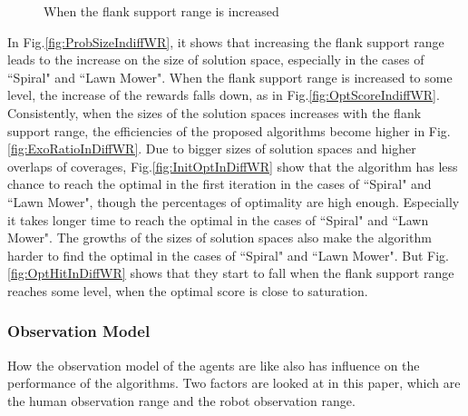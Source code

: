 \documentclass[12pt]{article}
\begin{document}
\begin{figure}[H]
  \caption{When the flank support range is increased} 
  \label{fig:PMdiffWR2} %
\end{figure}

In Fig.\ref{fig:ProbSizeIndiffWR}, it shows that increasing the flank support range leads to the increase on the size of solution space, especially in the cases of ``Spiral" and ``Lawn Mower". When the flank support range is increased to some level, the increase of the rewards falls down, as in Fig.\ref{fig:OptScoreIndiffWR}. Consistently, when the sizes of the solution spaces increases with the flank support range, the efficiencies of the proposed algorithms become higher in Fig.\ref{fig:ExoRatioInDiffWR}. Due to bigger sizes of solution spaces and higher overlaps of coverages, Fig.\ref{fig:InitOptInDiffWR} show that the algorithm has less chance to reach the optimal in the first iteration in the cases of ``Spiral" and ``Lawn Mower", though the percentages of optimality are high enough. Especially it takes longer time to reach the optimal in the cases of ``Spiral" and ``Lawn Mower". The growths of the sizes of solution spaces also make the algorithm harder to find the optimal in the cases of ``Spiral" and ``Lawn Mower". But Fig.\ref{fig:OptHitInDiffWR} shows that they start to fall when the flank support range reaches some level, when the optimal score is close to saturation.


\subsubsection{Observation Model}

How the observation model of the agents are like also has influence on the performance of the algorithms. Two factors are looked at in this paper, which are the human observation range and the robot observation range.
\end{document}

